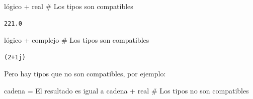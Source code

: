 \documentclass[
  spanish,
  letterpaper,
]{scrbook}
\newenvironment{Shaded}{\begin{snugshade}}{\end{snugshade}}
\newcommand{\CommentTok}[1]{\textcolor[rgb]{0.37,0.37,0.37}{#1}}
\newcommand{\NormalTok}[1]{\textcolor[rgb]{0.00,0.23,0.31}{#1}}
\newcommand{\OperatorTok}[1]{\textcolor[rgb]{0.37,0.37,0.37}{#1}}
\newcommand{\StringTok}[1]{\textcolor[rgb]{0.13,0.47,0.30}{#1}}
\theoremstyle{definition}
\theoremstyle{remark}
\begin{document}
\begin{Shaded}
\begin{Highlighting}[]
\NormalTok{lógico }\OperatorTok{+}\NormalTok{ real }\CommentTok{\# Los tipos son compatibles}
\end{Highlighting}
\end{Shaded}

\begin{verbatim}
221.0
\end{verbatim}

\begin{Shaded}
\begin{Highlighting}[]
\NormalTok{lógico }\OperatorTok{+}\NormalTok{ complejo }\CommentTok{\# Los tipos son compatibles}
\end{Highlighting}
\end{Shaded}

\begin{verbatim}
(2+1j)
\end{verbatim}

Pero hay tipos que no son compatibles, por ejemplo:

\begin{Shaded}
\begin{Highlighting}[]
\NormalTok{cadena }\OperatorTok{=} \StringTok{\textquotesingle{}El resultado es igual a \textquotesingle{}}
\NormalTok{cadena }\OperatorTok{+}\NormalTok{ real  }\CommentTok{\# Los tipos no son compatibles}
\end{Highlighting}
\end{Shaded}
\end{document}
